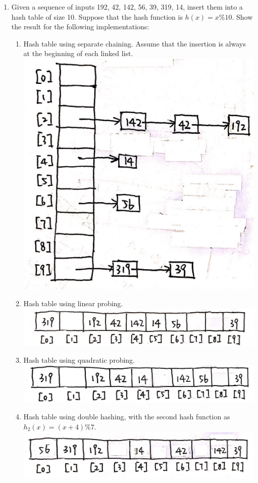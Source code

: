 \documentclass[12pt,a4paper]{article}
\theoremstyle{definition}
\begin{document}
\begin{enumerate}
\item  Given a sequence of inputs 192, 42, 142, 56, 39, 319, 14, insert them
into a hash table of size 10. Suppose that the hash function is $h(x) = x\%10$. Show the
result for the following implementations:
	\begin{enumerate}
	\item Hash table using separate chaining. Assume that the insertion is always at the
beginning of each linked list.\\
	\includegraphics[scale=0.12]{f1.jpg}
	\item Hash table using linear probing.\\
	\includegraphics[scale=0.14]{f2.jpg}
	\item Hash table using quadratic probing.\\
	\includegraphics[scale=0.12]{f3.jpg}
	\item Hash table using double hashing, with the second hash function as $h_2 (x) = (x+4)\%7$.\\
	\includegraphics[scale=0.11]{f4.jpg}


\end{enumerate}
\end{enumerate}
\end{document}
